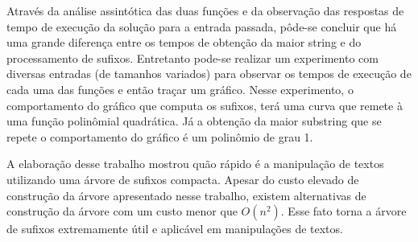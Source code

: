 Através da análise assintótica das duas funções e da observação das respostas
de tempo de execução da solução para a entrada passada, pôde-se concluir
que há uma grande diferença entre os tempos de obtenção da maior string e 
do processamento de sufixos.
Entretanto pode-se realizar um experimento com diversas entradas (de tamanhos
variados) para observar os tempos de execução de cada uma das funções e então
traçar um gráfico.
Nesse experimento, o comportamento do gráfico que computa os sufixos, terá uma
curva que remete à uma função polinômial quadrática.
Já a obtenção da maior substring que se repete o comportamento do gráfico é um
polinômio de grau 1.

A elaboração desse trabalho mostrou quão rápido é a manipulação de textos utilizando
uma árvore de sufixos compacta.
Apesar do custo elevado de construção da árvore apresentado nesse trabalho, existem
alternativas de construção da árvore com um custo menor que $O(n^2)$.
Esse fato torna a árvore de sufixos extremamente útil e aplicável em manipulações de
textos.